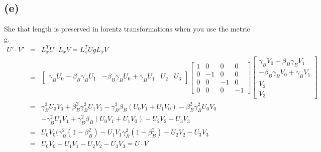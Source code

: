 \documentclass[11pt]{amsart}
\begin{document}
\subsection*{(e)} She that length is preserved in lorentz transformations when you use the metric g. \\
\begin{eqnarray*} 
U'\cdot{V'} &=& L_{x}^{T}U\cdot{L_{x}V} = L_{x}^{T}UgL_{x}V \\
&=& \begin{bmatrix}
	\gamma_{B}U_{0}-\beta_{B}\gamma_{B}U_{1} & -\beta_{B}\gamma_{B}U_{0}+\gamma_{B}U_{1} & U_{2} & U_{3} 
\end{bmatrix}\begin{bmatrix}
	1 & 0 & 0 & 0 \\
	0 & -1 & 0 & 0 \\
	0 & 0 & -1 & 0 \\
	0 & 0 & 0 & -1 
	\end{bmatrix}\begin{bmatrix}
	\gamma_{B}V_{0}-\beta_{B}\gamma_{B}V_{1} \\
	-\beta_{B}\gamma_{B}V_{0}+\gamma_{B}V_{1} \\
	V_{2} \\
	V_{3}
	\end{bmatrix} \\
&=& \gamma_{B}^{2}U_{0}V_{0}+\beta_{B}^{2}\gamma_{B}^{2}U_{1}V_{1}-\gamma_{B}^{2}\beta_{B}(U_{0}V_{1}+U_{1}V_{0})-\beta_{B}^{2}\gamma_{B}^{2}U_{0}V_{0} \\
& & -\gamma_{B}^{2}U_{1}V_{1}+\gamma_{B}^{2}\beta_{B}(U_{0}V_{1}+U_{1}V_{0})-U_{2}V_{2}-U_{3}V_{3} \\
&=& U_{0}V_{0}(\gamma_{B}^{2}(1-\beta_{B}^{2})-U_{1}V_{1}\gamma_{B}^{2}(1-\beta_{B}^{2})-U_{2}V_{2}-U_{3}V_{3} \\
&=& U_{0}V_{0}-U_{1}V_{1}-U_{2}V_{2}-U_{3}V_{3} = U\cdot{V} 
\end{eqnarray*} \\
\end{document}
